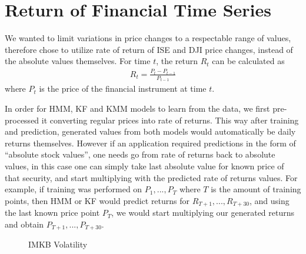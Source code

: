 \section{Return of Financial Time Series}

We wanted to limit variations in price changes to a respectable range of values,
therefore chose to utilize rate of return of ISE and DJI price changes, instead
of the absolute values themselves. For time $t$, the return $R_t$ can be
calculated as
\begin{eqnarray*}
R_t = \frac{P_t - P_{t-1}}{P_{t-1}}
\end{eqnarray*}
where $P_t$ is the price of the financial instrument at time $t$. 

In order for HMM, KF and KMM models to learn from the data, we first pre-processed it
converting regular prices into rate of returns. This way after training and
prediction, generated values from both models would automatically be daily
returns themselves. However if an application required predictions in the form
of ``absolute stock values'', one needs go from rate of returns back to absolute
values, in this case one can simply take last absolute value for known price of
that security, and start multiplying with the predicted rate of returns
values. For example, if training was performed on $P_1,...,P_T$ where $T$ is the
amount of training points, then HMM or KF would predict returns for
$R_{T+1},...,R_{T+30}$, and using the last known price point $P_T$, we would
start multiplying our generated returns and obtain $P_{T+1},...,P_{T+30}$.

\begin{figure}[!hbp]
\caption{IMKB Volatility}
\vspace{0.6cm}
\end{figure}


